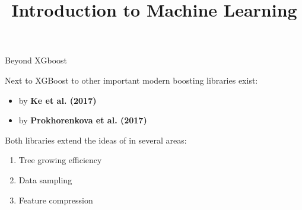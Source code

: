 






\newcommand{\titlefigure}{figure_man/split-finding02.png}
\newcommand{\learninggoals}{
  \item \textcolor{blue}{XXX}
  \item \textcolor{blue}{XXX}
}

\title{Introduction to Machine Learning}
\date{}





\begin{vbframe}{Beyond XGboost}

Next to XGBoost to other important modern boosting libraries exist:

\lz

\begin{itemize}
  \item {} by \textbf{Ke et al. (2017)}
  \item {} by \textbf{Prokhorenkova et al. (2017)}
\end{itemize}

\lz

Both libraries extend the ideas of  in several areas:

\lz

\begin{enumerate}
  \item Tree growing efficiency
  \item Data sampling
  \item Feature compression
\end{enumerate}

\end{vbframe}

